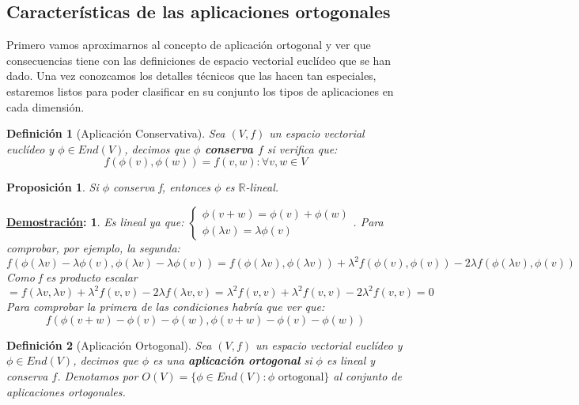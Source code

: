 \documentclass[10pt,a4paper,openright]{book}
\theoremstyle{break}
\newtheorem*{defi}{Definición}
\newtheorem*{prop}{Proposición}
\newtheorem*{demo}{\underline{Demostración}:}
\begin{document}
\subsection{Características de las aplicaciones ortogonales}
Primero vamos aproximarnos al concepto de aplicación ortogonal y ver que consecuencias tiene con las definiciones de espacio vectorial euclídeo que se han dado. Una vez conozcamos los detalles técnicos que las hacen tan especiales, estaremos listos para poder clasificar en su conjunto los tipos de aplicaciones en cada dimensión.

\begin{defi}[Aplicación Conservativa]
Sea $(V,f)$ un espacio vectorial euclídeo y $\phi \in End(V)$, decimos que \textbf{$\phi$ conserva $f$} si verifica que:
$$f(\phi(v),\phi(w)) = f(v,w): \forall v,w\in V$$
\end{defi}

\begin{prop}
Si $\phi$ conserva f, entonces $\phi$ es $\mathbb{R}$-lineal.
\end{prop}
\begin{demo}
Es lineal ya que: $\begin{cases} \phi(v+w) = \phi(v)+\phi(w) \\ \phi(\lambda v) = \lambda \phi(v) \end{cases}$. Para comprobar, por ejemplo, la segunda:
$$f(\phi(\lambda v) - \lambda \phi(v),\phi(\lambda v) - \lambda \phi(v)) = f(\phi(\lambda v), \phi(\lambda v)) + \lambda^2 f(\phi(v),\phi(v)) - 2\lambda f(\phi(\lambda v), \phi(v)) $$
Como f es producto escalar
$$= f(\lambda v, \lambda v) + \lambda^2 f(v,v) -2\lambda f(\lambda v, v) = \lambda^2 f(v,v) + \lambda^2 f(v,v) - 2\lambda^2 f(v,v) = 0$$
Para comprobar la primera de las condiciones habría que ver que:
$$ f(\phi(v+w) - \phi(v) - \phi(w), \phi(v+w) - \phi(v) - \phi(w))$$
\end{demo}

\begin{defi}[Aplicación Ortogonal]
Sea $(V,f)$ un espacio vectorial euclídeo y $\phi\in End(V)$, decimos que $\phi$ es una \textbf{aplicación ortogonal} si $\phi$ es lineal y conserva $f$.
Denotamos por $O(V) = \{\phi\in End(V): \phi \mbox{ ortogonal}\}$ al conjunto de aplicaciones ortogonales.
\end{defi}
\end{document}
